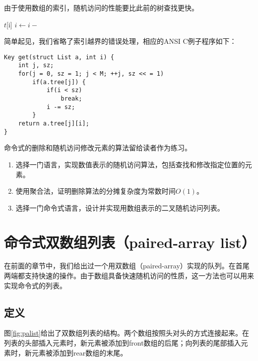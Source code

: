 \documentclass[UTF8]{article}
\begin{document}
由于使用数组的索引，随机访问的性能要比此前的树查找更快。

\begin{algorithmic}
        \State \Return $t$[i]
      \Else
        \State $i \gets i -$ 
      \EndIf
    \EndIf
  \EndFor
\EndFunction
\end{algorithmic}

简单起见，我们省略了索引越界的错误处理，相应的ANSI C例子程序如下：

\begin{lstlisting}
Key get(struct List a, int i) {
    int j, sz;
    for(j = 0, sz = 1; j < M; ++j, sz << = 1)
        if(a.tree[j]) {
            if(i < sz)
                break;
            i -= sz;
        }
    return a.tree[j][i];
}
\end{lstlisting}

命令式的删除和随机访问修改元素的算法留给读者作为练习。

\begin{Exercise}
\begin{enumerate}
\item 选择一门语言，实现数值表示的随机访问算法，包括查找和修改指定位置的元素。

\item 使用聚合法，证明删除算法的分摊复杂度为常数时间$O(1)$。

\item 选择一门命令式语言，设计并实现用数组表示的二叉随机访问列表。
\end{enumerate}
\end{Exercise}

\section{命令式双数组列表（paired-array list）}

在前面的章节中，我们给出过一个用双数组（paired-array）实现的队列。在首尾两端都支持快速的操作。由于数组具备快速随机访问的性质，这一方法也可以用来实现命令式的列表。

\subsection{定义}

图\ref{fig:palist}给出了双数组列表的结构。两个数组按照头对头的方式连接起来。在列表的头部插入元素时，新元素被添加到front数组的后尾；向列表的尾部插入元素时，新元素被添加到rear数组的末尾。
\end{document}
